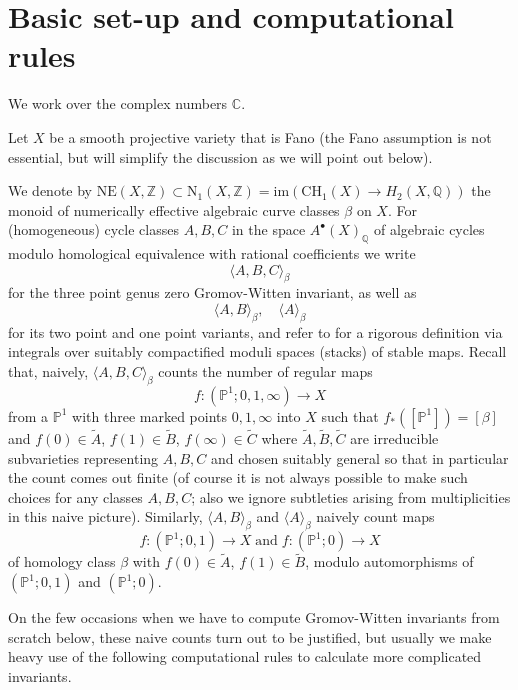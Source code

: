 \documentclass[11pt]{amsart}
\theoremstyle{plain}
\numberwithin{equation}{section}
\theoremstyle{definition}
\theoremstyle{remark}
\begin{document}
\section{Basic set-up and computational rules}\label{sRules}

We work over the complex numbers $\mathbb{C}$. 

Let $X$ be a smooth projective variety that is Fano (the Fano assumption is not essential, but will simplify the discussion as we will point out below). 

We denote by $\mathrm{NE}(X, \mathbb{Z})\subset \mathrm{N}_1 (X, \mathbb{Z}) = \mathrm{im}(\mathrm{CH}_1(X) \to H_2(X, \mathbb{Q}))$ the monoid of numerically effective algebraic curve classes $\beta$ on $X$. For (homogeneous) cycle classes $A, B, C$ in the space $A^{\bullet}(X)_{\mathbb{Q}}$ of algebraic cycles modulo homological equivalence with rational coefficients we write 
\[
\langle A, B, C\rangle_{\beta}
\]
for the three point genus zero Gromov-Witten invariant, as well as 
\[
\langle A, B \rangle_{\beta}, \quad \langle A \rangle_{\beta}
\]
for its two point and one point variants, and refer to \cite{KM94, FP95, Manin99} for a rigorous definition via integrals over suitably compactified moduli spaces (stacks) of stable maps. Recall that, naively, $\langle A, B, C\rangle_{\beta}$ counts the number of regular maps
\[
f \colon (\mathbb{P}^1 ; 0, 1, \infty) \to X 
\]
from a $\mathbb{P}^1$ with three marked points $0, 1, \infty$ into $X$ such that $f_* ([\mathbb{P}^1]) = [\beta]$ and $f(0) \in \widetilde{A}$, $f(1) \in \widetilde{B}$, $f(\infty) \in \widetilde{C}$ where $\widetilde{A}, \widetilde{B}, \widetilde{C}$ are irreducible subvarieties representing $A, B, C$ and chosen suitably general so that in particular the count comes out finite (of course it is not always possible to make such choices for any classes $A, B, C$; also we ignore subtleties arising from multiplicities in this naive picture). Similarly, $\langle A, B\rangle_{\beta}$ and $\langle A\rangle_{\beta}$ naively count maps 
\[
f \colon (\mathbb{P}^1 ; 0, 1 ) \to X \; \mathrm{and} \; f \colon (\mathbb{P}^1 ; 0 ) \to X
\]
of homology class $\beta$ with $f(0) \in \widetilde{A}$, $f(1) \in \widetilde{B}$, modulo automorphisms of $(\mathbb{P}^1 ; 0, 1 )$ and $(\mathbb{P}^1 ; 0 )$. 

On the few occasions when we have to compute Gromov-Witten invariants from scratch below, these naive counts turn out to be justified, but usually we make heavy use of the following computational rules to calculate more complicated invariants.
\end{document}
